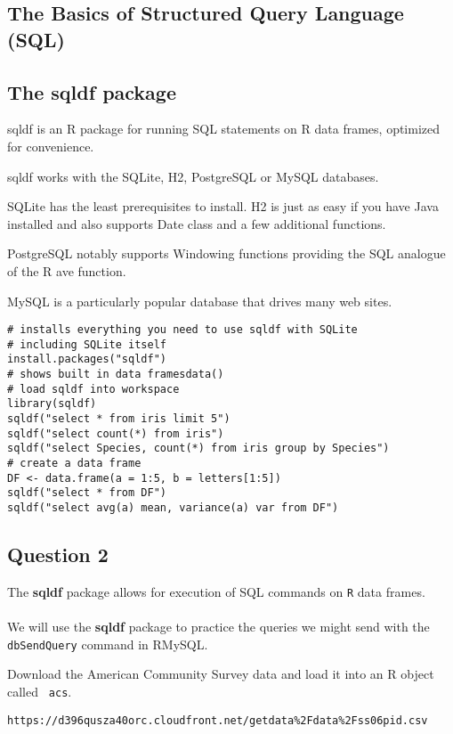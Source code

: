 \documentclass[12pt]{article}
\begin{document}
\subsection*{The Basics of Structured Query Language (SQL)}
\newpage
\subsection*{The sqldf package}
sqldf is an R package for running SQL statements on R data frames, optimized for convenience. 

sqldf works with the SQLite, H2, PostgreSQL or MySQL databases. 

SQLite has the least prerequisites to install. H2 is just as easy if you have Java installed and also supports Date class and a few additional functions. 

PostgreSQL notably supports Windowing functions providing the SQL analogue of the R ave function. 

MySQL is a particularly popular database that drives many web sites. 

\begin{framed}
\begin{verbatim}
# installs everything you need to use sqldf with SQLite
# including SQLite itself
install.packages("sqldf")
# shows built in data framesdata() 
# load sqldf into workspace
library(sqldf)
sqldf("select * from iris limit 5")
sqldf("select count(*) from iris")
sqldf("select Species, count(*) from iris group by Species")
# create a data frame
DF <- data.frame(a = 1:5, b = letters[1:5])
sqldf("select * from DF")
sqldf("select avg(a) mean, variance(a) var from DF")
\end{verbatim}
\end{framed}
\newpage
\subsection*{Question 2}
The \textbf{sqldf} package allows for execution of SQL commands on \texttt{R} data frames. \\\\ \noindent We will use the \textbf{sqldf} package to practice the queries we might send with the \texttt{dbSendQuery} command in RMySQL. 

\bigskip
\noindent Download the American Community Survey data and load it into an R object called
\texttt{ acs}.

\begin{verbatim}
https://d396qusza40orc.cloudfront.net/getdata%2Fdata%2Fss06pid.csv 
\end{verbatim}
\end{document}
